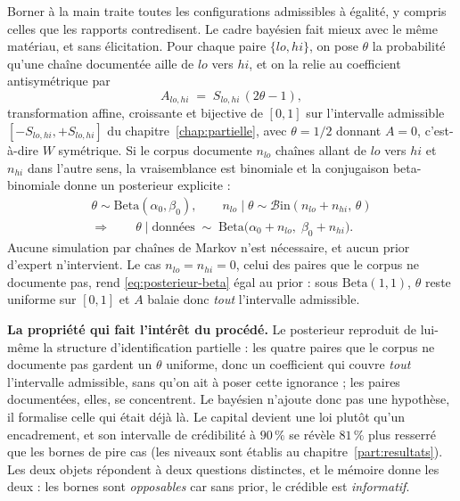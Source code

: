 Borner à la main traite toutes les configurations admissibles à égalité, y compris celles que
les rapports contredisent. Le cadre bayésien fait mieux avec le même matériau, et sans
élicitation. Pour chaque paire $\{lo,hi\}$, on pose $\theta$ la probabilité qu'une chaîne
documentée aille de $lo$ vers $hi$, et on la relie au coefficient antisymétrique par
\[
  A_{lo,hi} \;=\; S_{lo,hi}\,(2\theta - 1),
\]
transformation affine, croissante et bijective de $[0,1]$ sur l'intervalle admissible
$[-S_{lo,hi},+S_{lo,hi}]$ du chapitre~\ref{chap:partielle}, avec $\theta=1/2$ donnant $A=0$,
c'est-à-dire $W$ symétrique. Si le corpus documente $n_{lo}$ chaînes allant de $lo$ vers $hi$ et
$n_{hi}$ dans l'autre sens, la vraisemblance est binomiale et la conjugaison beta-binomiale
donne un posterieur explicite :
\begin{equation}
  \begin{gathered}
  \theta \sim \mathrm{Beta}(\alpha_0,\beta_0),
  \qquad
  n_{lo}\mid\theta \sim \mathcal{B}\mathrm{in}(n_{lo}+n_{hi},\,\theta)
  \\
  \Longrightarrow\qquad
  \theta \mid \text{données} \;\sim\; \mathrm{Beta}\bigl(\alpha_0+n_{lo},\;\beta_0+n_{hi}\bigr).
  \end{gathered}
\end{equation}
Aucune simulation par chaînes de Markov n'est nécessaire, et aucun prior d'expert n'intervient.
Le cas $n_{lo}=n_{hi}=0$, celui des paires que le corpus ne documente pas, rend
\eqref{eq:posterieur-beta} égal au prior : sous $\mathrm{Beta}(1,1)$, $\theta$ reste uniforme sur
$[0,1]$ et $A$ balaie donc \emph{tout} l'intervalle admissible.

\begin{cle}
\textbf{La propriété qui fait l'intérêt du procédé.} Le posterieur reproduit de
lui-même la structure d'identification partielle : les quatre paires que le corpus ne documente
pas gardent un $\theta$ uniforme, donc un coefficient qui couvre \emph{tout} l'intervalle
admissible, sans qu'on ait à poser cette ignorance ; les paires documentées, elles, se
concentrent. Le bayésien n'ajoute donc pas une hypothèse, il formalise celle qui était déjà là.
Le capital devient une loi plutôt qu'un encadrement, et son intervalle de crédibilité à
$90\,\%$ se révèle $81\,\%$ plus resserré que les bornes de pire cas (les niveaux sont établis
au chapitre~\ref{part:resultats}). Les deux objets répondent à deux questions distinctes, et le
mémoire donne les deux : les bornes sont \emph{opposables} car sans prior, le crédible est
\emph{informatif}.
\end{cle}

